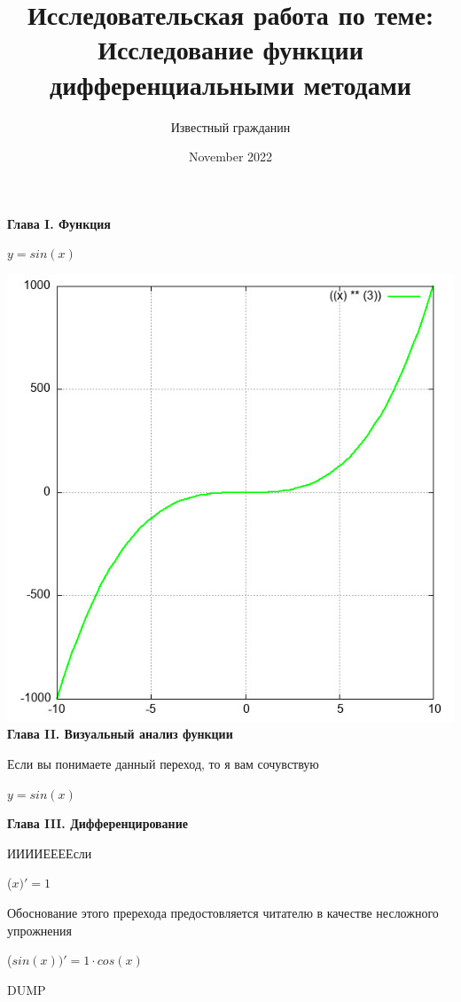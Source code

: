 \documentclass[12pt,a4paper,fleqn]{article}
\title{\textbf{\LARGE{Исследовательская работа по теме:\\Исследование функции дифференциальными методами}}}
\author{Известный гражданин}
\date{November 2022}
\begin{document}
\maketitle
\newpage\newpage \textbf{\LARGE{Глава I. Функция}}

\begin{center}
$y = $$sin(x)$

\end{center}
\includegraphics{GraphicDumps/plot.jpg}\newpage \textbf{\LARGE{Глава II. Визуальный анализ функции}}

Если вы понимаете данный переход, то я вам сочувствую

\begin{center}
$y = $$sin(x)$

\end{center}
\newpage \textbf{\LARGE{Глава III. Дифференцирование}}

ИИИИЕЕЕЕсли\cite{link3}

\begin{center}
 ($x)'
  = 1$\end{center}
Обоснование этого пререхода предостовляется читателю в качестве несложного упрожнения

\begin{center}
 ($sin(x))'
  = 1 \cdot cos(x)$\end{center}
DUMP
\end{document}
